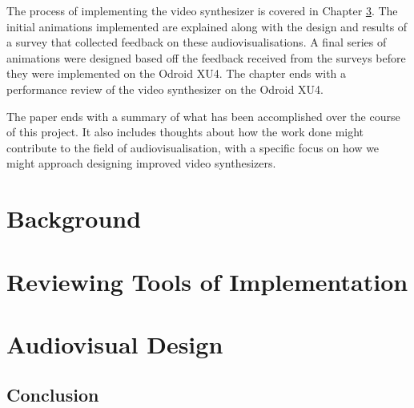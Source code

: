 \documentclass{report}
\begin{document}
The process of implementing the video synthesizer is covered in Chapter \ref{chap:avdesign}. The initial animations implemented are explained along with the design and results of a survey that collected feedback on these audiovisualisations. A final series of animations were designed based off the feedback received from the surveys before they were implemented on the Odroid XU4. The chapter ends with a performance review of the video synthesizer on the Odroid XU4. \par

The paper ends with a summary of what has been accomplished over the course of this project. It also includes thoughts about how the work done might contribute to the field of audiovisualisation, with a specific focus on how we might approach designing improved video synthesizers.


\chapter{Background}\label{chap:background}




\chapter{Reviewing Tools of Implementation}\label{chap:toolreview}



\chapter{Audiovisual Design}\label{chap:avdesign}





\section*{Conclusion}
\markright{}
\end{document}
